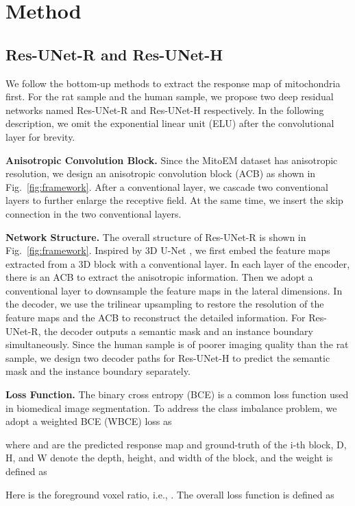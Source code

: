 \documentclass{article}
\begin{document}
\section{Method}
\label{sec:method}
\subsection{Res-UNet-R and Res-UNet-H}
We follow the bottom-up methods to extract the response map of mitochondria first. For the rat sample and the human sample, we propose two deep residual networks named Res-UNet-R and Res-UNet-H respectively. In the following description, we omit the exponential linear unit (ELU) after the convolutional layer for brevity.

\textbf{Anisotropic Convolution Block.} 
Since the MitoEM dataset has anisotropic resolution, we design an anisotropic convolution block (ACB) as shown in Fig.~\ref{fig:framework}. After a  conventional layer, we cascade two   conventional layers to further enlarge the receptive field. At the same time, we insert the skip connection in the two   conventional layers. 

\textbf{Network Structure.}
The overall structure of Res-UNet-R is shown in Fig.~\ref{fig:framework}. Inspired by 3D U-Net \cite{cciccek20163d}, we first embed the feature maps extracted from a 3D block with a  conventional layer. In each layer of the encoder, there is an ACB to extract the anisotropic information. Then we adopt a  conventional layer to downsample the feature maps in the lateral dimensions. In the decoder, we use the trilinear upsampling to restore the resolution of the feature maps and the ACB to reconstruct the detailed information. For Res-UNet-R, the decoder outputs a semantic mask and an instance boundary simultaneously. Since the human sample is of poorer imaging quality than the rat sample, we design two decoder paths for Res-UNet-H to predict the semantic mask and the instance boundary separately.



\textbf{Loss Function.} 
The binary cross entropy (BCE) is a common loss function used in biomedical image segmentation. To address the class imbalance problem, we adopt a weighted BCE (WBCE) loss as

where  and  are the predicted response map and ground-truth of the i-th block, D, H, and W denote the depth, height, and width of the block, and the weight  is defined as

Here  is the foreground voxel ratio, i.e., . 
The overall loss function  is defined as 
\end{document}
